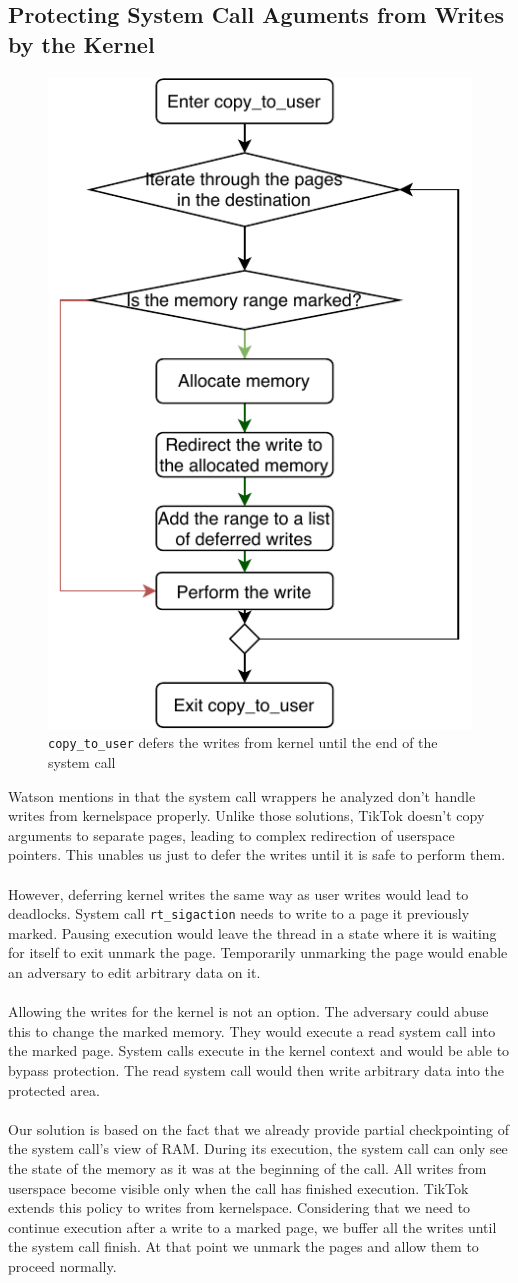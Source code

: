 \subsection{Protecting System Call Aguments from Writes by the Kernel}
\label{subsec:kernelland}
\begin{figure}[]
  \centering
  \includegraphics[width = .30 \textwidth]{img/copy_to_user.pdf}
  \caption{\texttt{copy\_to\_user} defers the writes from kernel until the end of the system call}
  \label{fig:pagetable}
\end{figure}

Watson mentions in \cite{watson} that the system call wrappers he analyzed don't handle writes from kernelspace
properly. Unlike those solutions, TikTok doesn't copy arguments to separate pages, leading to complex redirection 
of userspace pointers. This unables us just to defer the writes until it is safe to perform them.
\\
\\
However, deferring kernel writes the same way as user writes would lead to deadlocks. System call \texttt{rt\_sigaction}
needs to write to a page it previously marked. Pausing execution would leave the thread in a state where it is waiting for itself
to exit unmark the page. Temporarily unmarking the page would enable an adversary to edit arbitrary data on it.
\\
\\
Allowing the writes for the kernel is not an option. The adversary could abuse this to change the marked memory. 
They would execute a read system call into the marked page. System calls execute in the kernel context and would 
be able to bypass protection. The read system call would then write arbitrary data into the protected area.
\\
\\
Our solution is based on the fact that we already provide partial checkpointing of the system call's view of RAM.
During its execution, the system call can only see the state of the memory as it was at the beginning of the call.
All writes from userspace become visible only when the call has finished execution. TikTok extends this policy to 
writes from kernelspace. Considering that we need to continue execution after a write to a marked page, we buffer 
all the writes until the system call finish. At that point we unmark the pages and allow them to proceed normally.

